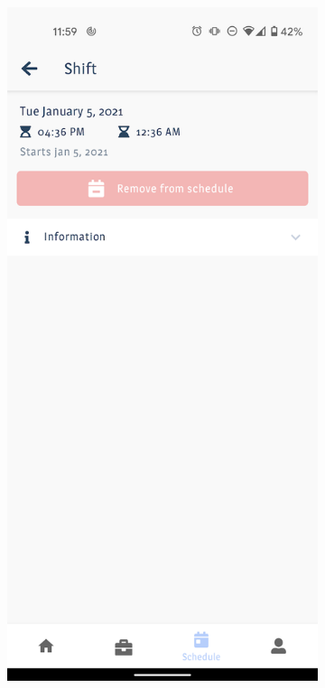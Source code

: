 \documentclass[twoside]{ctuthesis}
\begin{document}
\begin{figure}[ht]
	\centering
	\begin{subfigure}{.5\textwidth}
		\centering
		\includegraphics[width=.9\linewidth]{img/uc10a.png}
		\label{uc10a}
	\end{subfigure}%

\end{figure}
\end{document}

